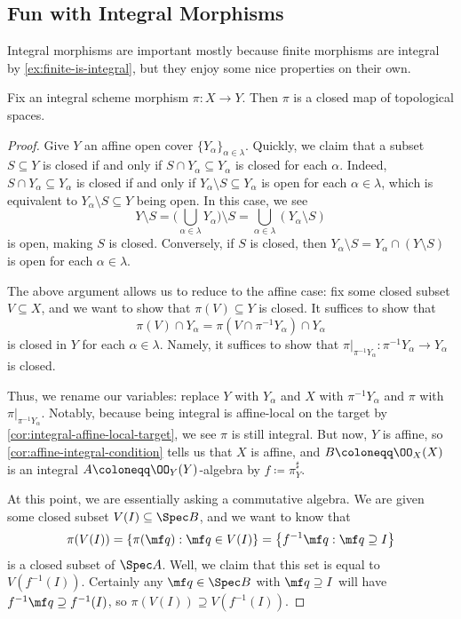 \documentclass[../notes.tex]{subfiles}
\begin{document}
\subsection{Fun with Integral Morphisms}
Integral morphisms are important mostly because finite morphisms are integral by \autoref{ex:finite-is-integral}, but they enjoy some nice properties on their own.
\begin{lemma} \label{lem:int-is-closed}
	Fix an integral scheme morphism $\pi\colon X\to Y$. Then $\pi$ is a closed map of topological spaces.
\end{lemma}
\begin{proof}
	Give $Y$ an affine open cover $\{Y_\alpha\}_{\alpha\in\lambda}$. Quickly, we claim that a subset $S\subseteq Y$ is closed if and only if $S\cap Y_\alpha\subseteq Y_\alpha$ is closed for each $\alpha$. Indeed, $S\cap Y_\alpha\subseteq Y_\alpha$ is closed if and only if $Y_\alpha\setminus S\subseteq Y_\alpha$ is open for each $\alpha\in\lambda$, which is equivalent to $Y_\alpha\setminus S\subseteq Y$ being open. In this case, we see
	\[Y\setminus S=\Bigg(\bigcup_{\alpha\in\lambda}Y_\alpha\Bigg)\setminus S=\bigcup_{\alpha\in\lambda}(Y_\alpha\setminus S)\]
	is open, making $S$ is closed. Conversely, if $S$ is closed, then $Y_\alpha\setminus S=Y_\alpha\cap(Y\setminus S)$ is open for each $\alpha\in\lambda$.

	The above argument allows us to reduce to the affine case: fix some closed subset $V\subseteq X$, and we want to show that $\pi(V)\subseteq Y$ is closed. It suffices to show that
	\[\pi(V)\cap Y_\alpha=\pi(V\cap\pi^{-1}Y_\alpha)\cap Y_\alpha\]
	is closed in $Y$ for each $\alpha\in\lambda$. Namely, it suffices to show that $\pi|_{\pi^{-1}Y_\alpha}\colon\pi^{-1}Y_\alpha\to Y_\alpha$ is closed.

	Thus, we rename our variables: replace $Y$ with $Y_\alpha$ and $X$ with $\pi^{-1}Y_\alpha$ and $\pi$ with $\pi|_{\pi^{-1}Y_\alpha}$. Notably, because being integral is affine-local on the target by \autoref{cor:integral-affine-local-target}, we see $\pi$ is still integral. But now, $Y$ is affine, so \autoref{cor:affine-integral-condition} tells us that $X$ is affine, and $B\coloneqq\OO_X(X)$ is an integral $A\coloneqq\OO_Y(Y)$-algebra by $f\coloneqq\pi^\sharp_Y$.

	At this point, we are essentially asking a commutative algebra. We are given some closed subset $V(I)\subseteq\Spec B$, and we want to know that
	\[\pi(V(I))=\{\pi(\mf q):\mf q\in V(I)\}=\left\{f^{-1}\mf q:\mf q\supseteq I\right\}\]
	is a closed subset of $\Spec A$. Well, we claim that this set is equal to $V\left(f^{-1}(I)\right)$. Certainly any $\mf q\in\Spec B$ with $\mf q\supseteq I$ will have $f^{-1}\mf q\supseteq f^{-1}(I)$, so $\pi(V(I))\supseteq V\left(f^{-1}(I)\right)$.
	

\end{proof}
\end{document}
